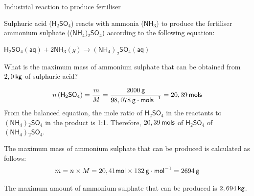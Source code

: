       \noindent 
      \begin{wex}{Industrial reaction to produce fertiliser }
{
\label{m38712*probfhsst!!!underscore!!!id2068}
      \label{m38712*id284606}Sulphuric acid ($\mathsf{H}{}_{2}\mathsf{SO}{}_{4}$) reacts with ammonia ($\mathsf{NH}{}_{3}$) to produce the fertiliser ammonium sulphate (($\mathsf{NH}{}_{4}$)${}_{2}\mathsf{SO}{}_{4}$) according to the following equation:\par 
      \label{m38712*id284690}${\mathsf{H}}_{2}{\mathsf{SO}}_{4}\left(\mathsf{aq}\right)+2{\mathsf{NH}}_{3}\left(g\right)\to {\left({\mathsf{NH}}_{4}\right)}_{2}{\mathsf{SO}}_{4}\left(\mathsf{aq}\right)$
      \par 
      \label{m38712*id284791}What is the maximum mass of ammonium sulphate that can be obtained from $2,0\phantom{\rule{2pt}{0ex}}\mathsf{kg}$ of sulphuric acid?
 \par 
      \vspace{5pt} }
{
      \label{m38712*id284813}\nopagebreak\noindent{}
    \begin{equation}
    n\left({\mathsf{H}}_{2}{\mathsf{SO}}_{4}\right)=\frac{m}{M}=\frac{2 000\phantom{\rule{2pt}{0ex}}\mathsf{g}}{98,078\phantom{\rule{2pt}{0ex}}\mathsf{g}\ensuremath{\cdot}{\mathsf{mols}}^{-1}}=20,39\phantom{\rule{2pt}{0ex}}\mathsf{mols}
      \end{equation}
      \label{m38712*id285156}From the balanced equation, the mole ratio of $\mathsf{H}{}_{2}\mathsf{SO}{}_{4}$ in the reactants to $\left(\mathsf{NH}{}_{4}\right){}_{2}\mathsf{SO}{}_{4}$ in the product is 1:1. Therefore, $20,39\phantom{\rule{2pt}{0ex}}\mathsf{mols}$ of $\mathsf{H}{}_{2}\mathsf{SO}{}_{4}$ of $\left(\mathsf{NH}{}_{4}\right){}_{2}\mathsf{SO}{}_{4}$.\par 
{}
      \label{m38712*id285290}The maximum mass of ammonium sulphate that can be produced is calculated as follows:
      \label{m38712*id285296}\nopagebreak\noindent{}
    \begin{equation}
    m=n\ensuremath{\times}M=20,41\mathsf{mol}\ensuremath{\times}132\phantom{\rule{2pt}{0ex}}\mathsf{g}\ensuremath{\cdot}{\mathsf{mol}}^{-1}=2694\phantom{\rule{2pt}{0ex}}\mathsf{g}
      \end{equation}
      \par 
      \label{m38712*id285362}The maximum amount of ammonium sulphate that can be produced is $2,694\phantom{\rule{2pt}{0ex}}\mathsf{kg}$.
 \par 
}
    \end{wex}
